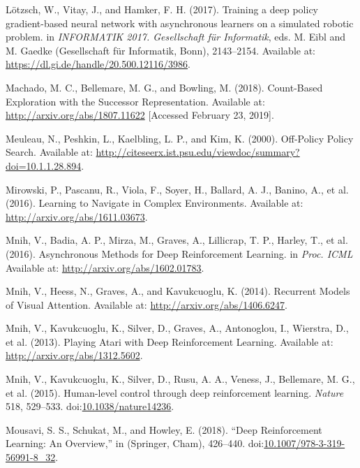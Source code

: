\documentclass[
  letterpaper,
  DIV=11,
  numbers=noendperiod]{scrreprt}
\newlength{\cslhangindent}
\newlength{\cslentryspacingunit} %
\newenvironment{CSLReferences}[2] %
 {%
  \setlength{\parindent}{0pt}
  \ifodd #1
  \let\oldpar\par
  \def\par{\hangindent=\cslhangindent\oldpar}
  \fi
  \setlength{\parskip}{#2\cslentryspacingunit}
 }%
 {}
\begin{document}
\begin{CSLReferences}{1}{0}
\leavevmode{}%
Lötzsch, W., Vitay, J., and Hamker, F. H. (2017). Training a deep policy
gradient-based neural network with asynchronous learners on a simulated
robotic problem. in \emph{{INFORMATIK} 2017. {Gesellschaft} für
{Informatik}}, eds. M. Eibl and M. Gaedke ({Gesellschaft für Informatik,
Bonn}), 2143--2154. Available at:
\url{https://dl.gi.de/handle/20.500.12116/3986}.

\leavevmode{}%
Machado, M. C., Bellemare, M. G., and Bowling, M. (2018). Count-{Based
Exploration} with the {Successor Representation}. Available at:
\url{http://arxiv.org/abs/1807.11622} {[}Accessed February 23, 2019{]}.

\leavevmode{}%
Meuleau, N., Peshkin, L., Kaelbling, L. P., and Kim, K. (2000).
Off-{Policy Policy Search}. Available at:
\url{http://citeseerx.ist.psu.edu/viewdoc/summary?doi=10.1.1.28.894}.

\leavevmode{}%
Mirowski, P., Pascanu, R., Viola, F., Soyer, H., Ballard, A. J., Banino,
A., et al. (2016). Learning to {Navigate} in {Complex Environments}.
Available at: \url{http://arxiv.org/abs/1611.03673}.

\leavevmode{}%
Mnih, V., Badia, A. P., Mirza, M., Graves, A., Lillicrap, T. P., Harley,
T., et al. (2016). Asynchronous {Methods} for {Deep Reinforcement
Learning}. in \emph{Proc. {ICML}} Available at:
\url{http://arxiv.org/abs/1602.01783}.

\leavevmode{}%
Mnih, V., Heess, N., Graves, A., and Kavukcuoglu, K. (2014). Recurrent
{Models} of {Visual Attention}. Available at:
\url{http://arxiv.org/abs/1406.6247}.

\leavevmode{}%
Mnih, V., Kavukcuoglu, K., Silver, D., Graves, A., Antonoglou, I.,
Wierstra, D., et al. (2013). Playing {Atari} with {Deep Reinforcement
Learning}. Available at: \url{http://arxiv.org/abs/1312.5602}.

\leavevmode{}%
Mnih, V., Kavukcuoglu, K., Silver, D., Rusu, A. A., Veness, J.,
Bellemare, M. G., et al. (2015). Human-level control through deep
reinforcement learning. \emph{Nature} 518, 529--533.
doi:\href{https://doi.org/10.1038/nature14236}{10.1038/nature14236}.

\leavevmode{}%
Mousavi, S. S., Schukat, M., and Howley, E. (2018). {``Deep
{Reinforcement Learning}: {An Overview},''} in ({Springer, Cham}),
426--440.
doi:\href{https://doi.org/10.1007/978-3-319-56991-8_32}{10.1007/978-3-319-56991-8\_32}.


\end{CSLReferences}
\end{document}
